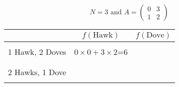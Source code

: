 \documentclass{article}
\begin{document}
\section*{}
\subsection*{}


\[
N=3
\text{ and }
A =
\begin{pmatrix}
    0 & 3 \\ 
    1 & 2
\end{pmatrix}
\]

\vspace{1cm}

\begin{center}
    \begin{tabular}{r|c|c}
        \toprule
                         & \(f(\text{Hawk})\)           & \(f(\text{Dove})\) \\
        \midrule
                         &                              & \\
        1 Hawk, 2 Doves  & \(0\times 0  + 3\times 2\)=6 & \phantom{\(0\times 0 + 3\times 2\)=6} \\
                         &                              & \\
        \midrule
                         &                              & \\
        2 Hawks, 1 Dove  &                              & \\
                         &                              & \\
        \bottomrule
    \end{tabular}
\end{center}

\subsection*{}
\end{document}
